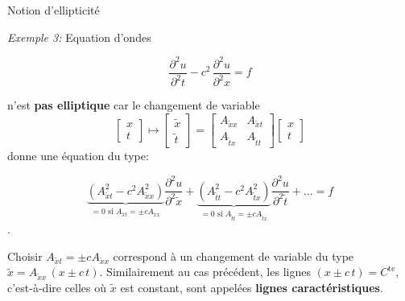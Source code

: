 \documentclass[
mode=present,    %
paper=a4paper,   %
orient=landscape,
display=slides,   %
size=10pt,
style=romain   %
]{powerdot}
\begin{document}
\begin{slide}[toc=Equ. ondes]{Notion d'ellipticité}

\emph{Exemple 3:} Equation d'ondes

\begin{equation*}
\frac{\partial^2 u}{\partial^2 t} -c^2\, \frac{\partial^2 u}{\partial^2 x} =  f
\end{equation*}

\bigskip

n'est \textbf{pas elliptique} car le changement de variable
\begin{equation*}
     \begin{bmatrix}
        x \\
        t
    \end{bmatrix}
    \mapsto
    \begin{bmatrix}
        \tilde{x} \\
        \tilde{t}
    \end{bmatrix}
    =
    \begin{bmatrix}
        A_{\tilde{x}x} & A_{\tilde{x}t} \\
        A_{\tilde{t}x} & A_{\tilde{t}t}
    \end{bmatrix}
    \begin{bmatrix}
        x \\
        t
    \end{bmatrix}
\end{equation*}
donne une équation du type:

\begin{equation*}
\underbrace{(A_{\tilde{x}t}^2 -c^2 A_{\tilde{x}x}^2)}_{=0 \text{ si } A_{\tilde{x}t} = \pm c A_{\tilde{x}x} }
\frac{\partial^2 u}{\partial^2 \tilde{x}} +
\underbrace{(A_{\tilde{t}t}^2 -c^2 A_{\tilde{t}x}^2)}_{=0 \text{ si } A_{\tilde{t}t} = \pm c A_{\tilde{t}x}}
\frac{\partial^2 u}{\partial^2 \tilde{t}} + ... =  f
\end{equation*}.

Choisir $A_{\tilde{x}t} = \pm c A_{\tilde{x}x}$ correspond à un changement de variable du type $\tilde{x} = A_{\tilde{x}x} \, (x\pm c\,t)$. Similairement au cas précédent, les lignes $(x\pm c\,t)=C^{\text{te}}$, c'est-à-dire celles où $\tilde{x}$ est constant, sont appelées \textbf{lignes caractéristiques}.

\end{slide}
\end{document}
